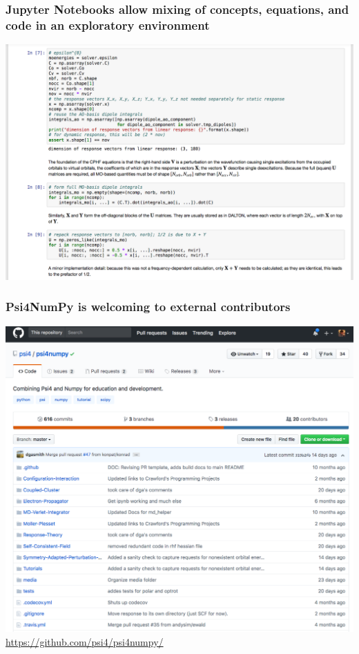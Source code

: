 \documentclass[%
    xcolor=usenames,dvipsnames,svgnames%
]{beamer}
\newenvironment{nscenter}
 {\parskip=0pt\par\nopagebreak\centering}
 {\par\noindent\ignorespacesafterend}
\newcommand\pfn{Psi4NumPy}
\begin{document}
\begin{frame}
  \frametitle{Jupyter Notebooks allow mixing of concepts, equations, and code in an exploratory environment}
  \begin{nscenter}
    \includegraphics[width=\linewidth,keepaspectratio]{./figures/psi4numpy_notebook_2.png}
  \end{nscenter}
\end{frame}

\begin{frame}
  \frametitle{\pfn{} is welcoming to external contributors}
  \begin{nscenter}
    \includegraphics[scale=0.20]{./figures/psi4numpy_github.png}
    {\scriptsize \url{https://github.com/psi4/psi4numpy/}}
  \end{nscenter}
\end{frame}
\end{document}
